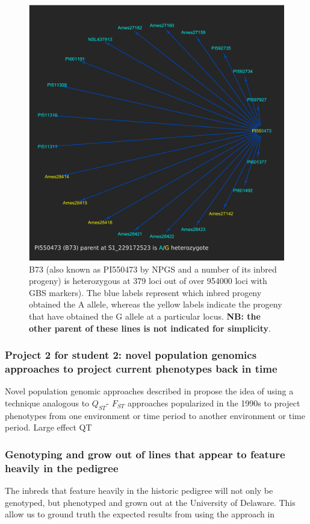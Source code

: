 \documentclass[12pt]{article}
\begin{document}
\begin{figure}[p]
\includegraphics[width=1.0\linewidth]{Pruned.pdf}
\caption{B73 (also known as PI550473 by NPGS and a number of its inbred progeny) is heterozygous at 379 loci out of over 954000 loci with GBS markers). The blue labels represent which inbred progeny obtained the A allele, whereas the yellow labels indicate the progeny that have obtained the G allele at a particular locus. \textbf{NB: the other parent of these lines is not indicated for simplicity}.}
\label{fig:alleledrop}
\end{figure}






\subsubsection*{Project 2 for student 2: novel population genomics approaches to project current phenotypes back in time}
\label{}
Novel population genomic approaches described in \cite{Berg:2014bs} propose the idea of using a technique analogous to $Q_{ST}$- $F_{ST}$ approaches popularized in the 1990s \cite{Latta:1998ek} to project phenotypes from one environment or time period to another environment or time period. Large effect QT

\subsubsection*{Genotyping and grow out of lines that appear to feature heavily in the pedigree}
The inbreds that feature heavily in the historic pedigree will not only be genotyped, but phenotyped and grown out at the University of Delaware. This allow us to ground truth the expected results from using the approach in \cite{Berg:2014bs}
\end{document}

